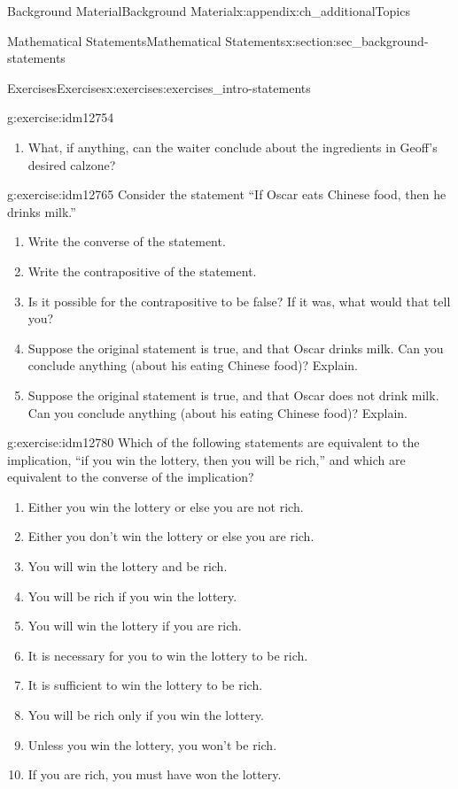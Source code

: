 \documentclass[oneside,10pt,]{book}
\numberwithin{equation}{chapter}
\begin{document}
\begin{appendixptx}{Background Material}{}{Background Material}{}{}{x:appendix:ch_additionalTopics}
\begin{sectionptx}{Mathematical Statements}{}{Mathematical Statements}{}{}{x:section:sec_background-statements}
\begin{exercises-subsection}{Exercises}{}{Exercises}{}{}{x:exercises:exercises_intro-statements}
\begin{divisionexercise}{3}{}{}{g:exercise:idm12754}
\begin{enumerate}[label=(\alph*)]
\item{}What, if anything, can the waiter conclude about the ingredients in Geoff's desired calzone?%
\end{enumerate}
\end{divisionexercise}%
\begin{divisionexercise}{4}{}{}{g:exercise:idm12765}%
Consider the statement ``If Oscar eats Chinese food, then he drinks milk.''%
%
\begin{enumerate}[label=(\alph*)]
\item{}Write the converse of the statement.%
\item{}Write the contrapositive of the statement.%
\item{}Is it possible for the contrapositive to be false? If it was, what would that tell you?%
\item{}Suppose the original statement is true, and that Oscar drinks milk. Can you conclude anything (about his eating Chinese food)? Explain.%
\item{}Suppose the original statement is true, and that Oscar does not drink milk. Can you conclude anything (about his eating Chinese food)? Explain.%
\end{enumerate}
\end{divisionexercise}%
\begin{divisionexercise}{5}{}{}{g:exercise:idm12780}%
Which of the following statements are equivalent to the implication, ``if you win the lottery, then you will be rich,'' and which are equivalent to the converse of the implication?%
%
\begin{enumerate}[label=(\alph*)]
\item{}Either you win the lottery or else you are not rich.%
\item{}Either you don't win the lottery or else you are rich.%
\item{}You will win the lottery and be rich.%
\item{}You will be rich if you win the lottery.%
\item{}You will win the lottery if you are rich.%
\item{}It is necessary for you to win the lottery to be rich.%
\item{}It is sufficient to win the lottery to be rich.%
\item{}You will be rich only if you win the lottery.%
\item{}Unless you win the lottery, you won't be rich.%
\item{}If you are rich, you must have won the lottery.%

\end{enumerate}
\end{divisionexercise}
\end{exercises-subsection}
\end{sectionptx}
\end{appendixptx}
\end{document}
